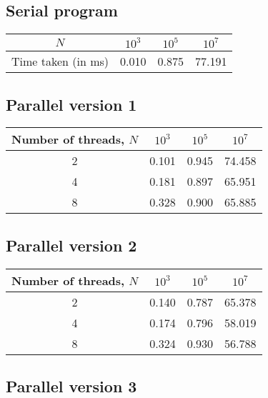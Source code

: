 \documentclass[a4paper]{article}
\begin{document}
\subsection{Serial program}

\begin{center}
    \begin{tabular}{|c|c|c|c|}
        \hline
        $N$ & $10^3$ & $10^5$ & $10^7$ \\
        \hline
        Time taken (in ms) & 0.010 & 0.875 & 77.191 \\
        \hline
    \end{tabular}
\end{center}

\subsection{Parallel version 1}

\begin{center}
    \begin{tabular}{|c|c|c|c|}
        \hline
        Number of threads, $N$ & $10^3$ & $10^5$ & $10^7$ \\
        \hline
        2  & 0.101 & 0.945 & 74.458 \\
        \hline
        4  & 0.181 & 0.897 & 65.951 \\
        \hline
        8  & 0.328 & 0.900 & 65.885 \\
        \hline
    \end{tabular}
\end{center}

\subsection{Parallel version 2}

\begin{center}
    \begin{tabular}{|c|c|c|c|}
        \hline
        Number of threads, $N$ & $10^3$ & $10^5$ & $10^7$ \\
        \hline
        2  & 0.140 & 0.787 & 65.378 \\
        \hline
        4  & 0.174 & 0.796 & 58.019 \\
        \hline
        8  & 0.324 & 0.930 & 56.788 \\
        \hline
    \end{tabular}
\end{center}

\subsection{Parallel version 3}
\end{document}
